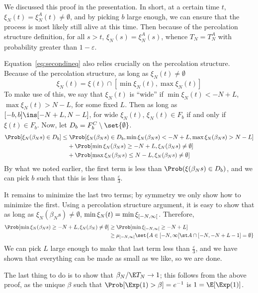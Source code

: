 \documentclass{scrartcl}
\newcommand{\ep}{\varepsilon}
\newcommand{\roi}[2]{\interval[open right]{#1}{#2}}
\newcommand{\Ninf}{\roi{-N}{\infty}}
\begin{document}
We discussed this proof in the presentation. In short, at a certain time $t$, $\xi_{N}(t) = \xi_{N}^{A}(t) \neq \emptyset$, and by picking $b$ large enough, we can ensure that the process is most likely still alive at this time. Then because of the percolation structure definition, for all $s > t$, $\xi_{N}(s) = \xi_{N}^{A}(s)$, whence $T_{N} = T_{N}^{A}$ with probability greater than $1 - \ep$.

Equation~\ref{eq:secondineq} also relies crucially on the percolation structure. Because of the percolation structure, as long as $\xi_{N}(t) \neq \emptyset$
\[ \xi_{N}(t) = \xi(t) \cap [\min \xi_{N}(t), \max \xi_{N}(t)] \]
To make use of this, we say that $\xi_{N}(t)$ is ``wide'' if $\min \xi_{N}(t) < -N + L$, $\max \xi_{N}(t) > N - L$, for some fixed $L$. Then as long as $[-b,b] \ins [-N+L, N-L]$, for wide $\xi_{N}(t)$, $\xi_{N}(t) \in F_{b}$ if and only if $\xi(t) \in F_{b}$. Now, let $D_{b} = F_{b}^{C} \setminus \set{\emptyset}$.
\begin{align*}
  \Prob[\xi_{N}(\beta_{N}s) \in D_{b}] \leq&\; \Prob[\xi_{N}(\beta_{N}s) \in D_{b}, \min \xi_{N}(\beta_{N}s) < -N + L, \max \xi_{N}(\beta_{N}s) > N - L] \\
                                &+ \Prob[\min \xi_{N}(\beta_{N}s) \geq -N + L, \xi_{N}(\beta_{N}s) \neq \emptyset] \\
                                &+ \Prob[\max \xi_{N}(\beta_{N}s) \leq N - L, \xi_{N}(\beta_{N}s) \neq \emptyset]
\end{align*}
By what we noted earlier, the first term is less than $\Prob(\xi(\beta_{N}s) \in D_{b})$, and we can pick $b$ such that this is less than $\frac{\ep}{3}$.

It remains to minimize the last two terms; by symmetry we only show how to minimize the first. Using a percolation structure argument, it is easy to show that as long as $\xi_{N}(\beta_{N}s) \neq \emptyset$, $\min \xi_{N}(t) = \min \xi_{\Ninf}$. Therefore,
\begin{align*}
  \Prob[\min \xi_{N}(\beta_{N}s) \geq -N + L, \xi_{N}(\beta_{N}) \neq \emptyset] &\geq \Prob[\min \xi_{\Ninf} \geq -N+L] \\
  &\geq \mu_{\Ninf}\set{A \in \Ninf \st A \cap [-N,-N+L-1] = \emptyset}
\end{align*}
We can pick $L$ large enough to make that last term less than $\frac{\ep}{3}$, and we have shown that everything can be made as small as we like, so we are done.

The last thing to do is to show that $\beta_{N}/\E T_{N} \to 1$; this follows from the above proof, as the unique $\beta$ such that $\Prob[\Exp(1) > \beta] = e^{-1}$ is $1 = \E[\Exp(1)]$.
\end{document}
